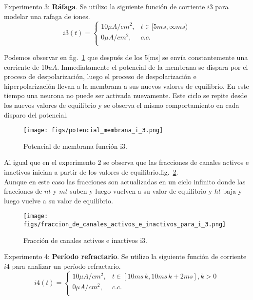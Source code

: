 \documentclass[aps,prl,twocolumn,groupedaddress]{revtex4-2}
\begin{document}
Experimento 3: \textbf{Ráfaga}. Se utilizo la siguiente función de corriente $i3$ para modelar una rafaga de iones.
$$
i3(t) = \left\{
\begin{array}{ll}
10 \mu A/cm^2, & t\in [5ms,\infty ms) \\
0 \mu A/cm^2, & c.c. \\
\end{array}
\right.
$$

Podemos observar en fig.~\ref{fig5} que después de los  5[ms] se envía constantemente una corriente de 10$uA$. Inmediatamente el potencial de la membrana se dispara por el proceso de despolarización, luego el proceso de despolarización e hiperpolarización llevan  a la membrana a sus nuevos valores de equilibrio. En este tiempo una neurona no puede ser activada nuevamente. Este ciclo se repite desde los nuevos valores de equilibrio y se observa el mismo comportamiento en cada disparo del potencial.\\


\begin{figure}[h!]
\centering
\texttt{[image: figs/potencial\_membrana\_i\_3.png]}
\caption{Potencial de membrana función i3. \label{fig5}}
\end{figure}


Al igual que en el experimento 2 se observa que las fracciones de canales activos e inactivos inician a partir de los valores de equilibrio.fig.~\ref{fig6}.\\
Aunque en este caso las fracciones son actualizadas en un ciclo infinito donde las fracciones de $nt$ y $mt$ suben y luego vuelven a su valor de equilibrio y $ht$ baja y luego vuelve a su valor de equilibrio. \\

\begin{figure}[h!]
\centering
\texttt{[image: figs/fraccion\_de\_canales\_activos\_e\_inactivos\_para\_i\_3.png]}
\caption{Fracción de canales activos e inactivos i3. \label{fig6}}
\end{figure}


Experimento 4: \textbf{Período refractario}. Se utilizo la siguiente función de corriente $i4$ para analizar un período refractario.
$$
i4(t) = \left\{
\begin{array}{ll}
10 \mu A/cm^2, & t\in [10ms\, k,10 ms\, k + 2ms], k > 0\\
0 \mu A/cm^2, & c.c. \\
\end{array}
\right.
$$
\end{document}
